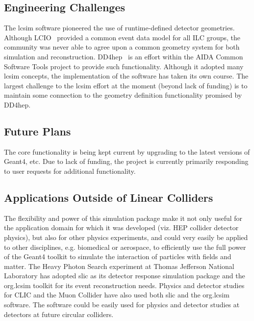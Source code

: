 \subsection{Engineering Challenges}
The lcsim software pioneered the use of runtime-defined detector geometries.
Although LCIO~\cite{lcioWebsite} provided a common event data model for all ILC groups, the
community was never able to agree upon a common geometry system for both
simulation and reconstruction. DD4hep~\cite{dd4hepWebsite} is an effort within the AIDA Common
Software Tools project to provide such functionality. Although it adopted many
lcsim concepts, the implementation of the software has taken its own course. The
largest challenge to the lcsim effort at the moment (beyond lack of funding) is
to maintain some connection to the geometry definition functionality promised by
DD4hep.

\subsection{Future Plans}
The core functionality is being kept current by upgrading to the latest versions
of Geant4, etc. Due to lack of funding, the project is currently primarily
responding to user requests for additional functionality.

\subsection{Applications Outside of Linear Colliders}
The flexibility and power of this simulation package make it not only useful for
the application domain for which it was developed (viz. HEP collider detector
physics), but also for other physics experiments, and could very easily be
applied to other disciplines, e.g. biomedical or aerospace, to efficiently use
the full power of the Geant4 toolkit to simulate the interaction of particles
with fields and matter. The Heavy Photon Search experiment at Thomas
Jefferson National Laboratory has adopted slic as its detector response
simulation package and the org.lcsim toolkit for its event reconstruction needs.
Physics and detector studies for CLIC and the Muon Collider have also
used both slic and the org.lcsim software. The software could be easily used for
physics and detector studies at detectors at future circular colliders.
